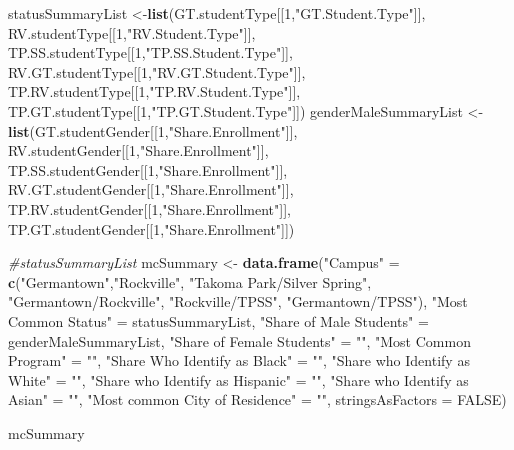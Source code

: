 \documentclass[]{article}
\newenvironment{Shaded}{\begin{snugshade}}{\end{snugshade}}
\newcommand{\KeywordTok}[1]{\textcolor[rgb]{0.13,0.29,0.53}{\textbf{#1}}}
\newcommand{\DataTypeTok}[1]{\textcolor[rgb]{0.13,0.29,0.53}{#1}}
\newcommand{\DecValTok}[1]{\textcolor[rgb]{0.00,0.00,0.81}{#1}}
\newcommand{\StringTok}[1]{\textcolor[rgb]{0.31,0.60,0.02}{#1}}
\newcommand{\CommentTok}[1]{\textcolor[rgb]{0.56,0.35,0.01}{\textit{#1}}}
\newcommand{\OtherTok}[1]{\textcolor[rgb]{0.56,0.35,0.01}{#1}}
\newcommand{\NormalTok}[1]{#1}
\begin{document}
\begin{Shaded}
\begin{Highlighting}[]
\NormalTok{statusSummaryList <-}\KeywordTok{list}\NormalTok{(GT.studentType[[}\DecValTok{1}\NormalTok{,}\StringTok{"GT.Student.Type"}\NormalTok{]], RV.studentType[[}\DecValTok{1}\NormalTok{,}\StringTok{"RV.Student.Type"}\NormalTok{]],}
\NormalTok{                         TP.SS.studentType[[}\DecValTok{1}\NormalTok{,}\StringTok{"TP.SS.Student.Type"}\NormalTok{]], RV.GT.studentType[[}\DecValTok{1}\NormalTok{,}\StringTok{"RV.GT.Student.Type"}\NormalTok{]],}
\NormalTok{                         TP.RV.studentType[[}\DecValTok{1}\NormalTok{,}\StringTok{"TP.RV.Student.Type"}\NormalTok{]], TP.GT.studentType[[}\DecValTok{1}\NormalTok{,}\StringTok{"TP.GT.Student.Type"}\NormalTok{]])}
\NormalTok{genderMaleSummaryList <-}\KeywordTok{list}\NormalTok{(GT.studentGender[[}\DecValTok{1}\NormalTok{,}\StringTok{"Share.Enrollment"}\NormalTok{]], RV.studentGender[[}\DecValTok{1}\NormalTok{,}\StringTok{"Share.Enrollment"}\NormalTok{]],}
\NormalTok{                         TP.SS.studentGender[[}\DecValTok{1}\NormalTok{,}\StringTok{"Share.Enrollment"}\NormalTok{]], RV.GT.studentGender[[}\DecValTok{1}\NormalTok{,}\StringTok{"Share.Enrollment"}\NormalTok{]],}
\NormalTok{                         TP.RV.studentGender[[}\DecValTok{1}\NormalTok{,}\StringTok{"Share.Enrollment"}\NormalTok{]], TP.GT.studentGender[[}\DecValTok{1}\NormalTok{,}\StringTok{"Share.Enrollment"}\NormalTok{]])}

\CommentTok{#statusSummaryList}
\NormalTok{mcSummary <-}\StringTok{ }\KeywordTok{data.frame}\NormalTok{(}\StringTok{"Campus"}\NormalTok{ =}\StringTok{ }\KeywordTok{c}\NormalTok{(}\StringTok{"Germantown"}\NormalTok{,}\StringTok{"Rockville"}\NormalTok{, }\StringTok{"Takoma Park/Silver Spring"}\NormalTok{, }\StringTok{"Germantown/Rockville"}\NormalTok{,}
                                     \StringTok{"Rockville/TPSS"}\NormalTok{, }\StringTok{"Germantown/TPSS"}\NormalTok{), }
                        \StringTok{"Most Common Status"}\NormalTok{ =}\StringTok{ }\NormalTok{statusSummaryList,}
                        \StringTok{"Share of Male Students"}\NormalTok{ =}\StringTok{ }\NormalTok{genderMaleSummaryList,}
                        \StringTok{"Share of Female Students"}\NormalTok{ =}\StringTok{ ""}\NormalTok{,}
                        \StringTok{"Most Common Program"}\NormalTok{ =}\StringTok{ ""}\NormalTok{,}
                        \StringTok{"Share Who Identify as Black"}\NormalTok{ =}\StringTok{ ""}\NormalTok{,}
                        \StringTok{"Share who Identify as White"}\NormalTok{ =}\StringTok{ ""}\NormalTok{,}
                        \StringTok{"Share who Identify as Hispanic"}\NormalTok{ =}\StringTok{ ""}\NormalTok{,}
                        \StringTok{"Share who Identify as Asian"}\NormalTok{ =}\StringTok{ ""}\NormalTok{,}
                        \StringTok{"Most common City of Residence"}\NormalTok{ =}\StringTok{ ""}\NormalTok{, }
                        \DataTypeTok{stringsAsFactors =} \OtherTok{FALSE}\NormalTok{)}

\NormalTok{mcSummary}
\end{Highlighting}
\end{Shaded}
\end{document}
